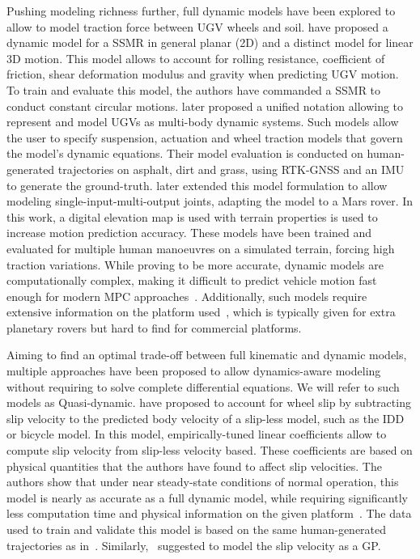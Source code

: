 Pushing modeling richness further, full dynamic models have been explored to allow to model traction force between \ac{UGV} wheels and soil. 
\citet{Yu2009} have proposed a dynamic model for a \ac{SSMR} in general planar (2D) and a distinct model for linear 3D motion. 
This model allows to account for rolling resistance, coefficient of friction, shear deformation modulus and gravity when predicting \ac{UGV} motion.
To train and evaluate this model, the authors have commanded a \ac{SSMR} to conduct constant circular motions.
\citet{Seegmiller2016} later proposed a unified notation allowing to represent and model \acp{UGV} as multi-body dynamic systems.
Such models allow the user to specify suspension, actuation and wheel traction models that govern the model's dynamic equations. 
Their model evaluation is conducted on human-generated trajectories on asphalt, dirt and grass, using \ac{RTK}-\ac{GNSS} and an \ac{IMU} to generate the ground-truth.
\citet{Yang2022} later extended this model formulation to allow modeling single-input-multi-output joints, adapting the model to a Mars rover.
In this work, a digital elevation map is used with terrain properties is used to increase motion prediction accuracy.
These models have been trained and evaluated for multiple human manoeuvres on a simulated terrain, forcing high traction variations. 
While proving to be more accurate, dynamic models are computationally complex, making it difficult to predict vehicle motion fast enough for modern \ac{MPC} approaches~\citep{Williams2018}. %
Additionally, such models require extensive information on the platform used~\citet{Yang2022}, which is typically given for extra planetary rovers but hard to find for commercial platforms.

Aiming to find an optimal trade-off between full kinematic and dynamic models, multiple approaches have been proposed to allow dynamics-aware modeling without requiring to solve complete differential equations.
We will refer to such models as Quasi-dynamic.
\citet{Seegmiller2014} have proposed to account for wheel slip by subtracting slip velocity to the predicted body velocity of a slip-less model, such as the \ac{IDD} or bicycle model.
In this model, empirically-tuned linear coefficients allow to compute slip velocity from slip-less velocity based.
These coefficients are based on physical quantities that the authors have found to affect slip velocities.
The authors show that under near steady-state conditions of normal operation, this model is nearly as accurate as a full dynamic model, while requiring significantly less computation time and physical information on the given platform~\citep{Seegmiller2014}.
The data used to train and validate this model is based on the same human-generated trajectories as in~\citep{Seegmiller2016}.
Similarly,~\citep{Ostafew2016} suggested to model the slip velocity as a \ac{GP}.



